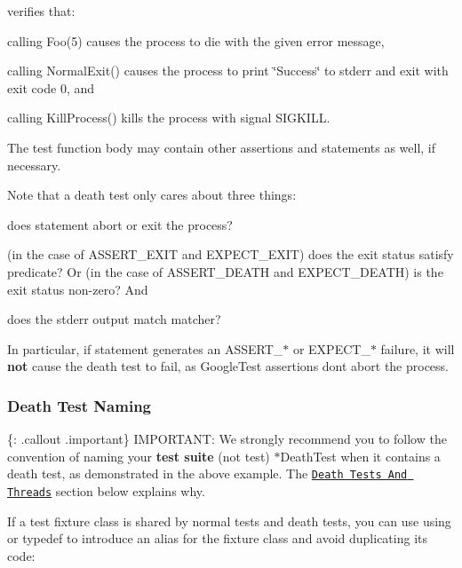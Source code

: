 verifies that\+:


\begin{DoxyItemize}
\item calling {\ttfamily Foo(5)} causes the process to die with the given error message,
\item calling {\ttfamily Normal\+Exit()} causes the process to print {\ttfamily \char`\"{}\+Success\char`\"{}} to stderr and exit with exit code 0, and
\item calling {\ttfamily Kill\+Process()} kills the process with signal {\ttfamily S\+I\+G\+K\+I\+LL}.
\end{DoxyItemize}

The test function body may contain other assertions and statements as well, if necessary.

Note that a death test only cares about three things\+:


\begin{DoxyEnumerate}
\item does {\ttfamily statement} abort or exit the process?
\item (in the case of {\ttfamily A\+S\+S\+E\+R\+T\+\_\+\+E\+X\+IT} and {\ttfamily E\+X\+P\+E\+C\+T\+\_\+\+E\+X\+IT}) does the exit status satisfy {\ttfamily predicate}? Or (in the case of {\ttfamily A\+S\+S\+E\+R\+T\+\_\+\+D\+E\+A\+TH} and {\ttfamily E\+X\+P\+E\+C\+T\+\_\+\+D\+E\+A\+TH}) is the exit status non-\/zero? And
\item does the stderr output match {\ttfamily matcher}?
\end{DoxyEnumerate}

In particular, if {\ttfamily statement} generates an {\ttfamily A\+S\+S\+E\+R\+T\+\_\+$\ast$} or {\ttfamily E\+X\+P\+E\+C\+T\+\_\+$\ast$} failure, it will {\bfseries not} cause the death test to fail, as Google\+Test assertions don\textquotesingle{}t abort the process.

\subsubsection*{Death Test Naming}

\{\+: .callout .important\} I\+M\+P\+O\+R\+T\+A\+NT\+: We strongly recommend you to follow the convention of naming your {\bfseries test suite} (not test) {\ttfamily $\ast$\+Death\+Test} when it contains a death test, as demonstrated in the above example. The \href{#death-tests-and-threads}{\tt Death Tests And Threads} section below explains why.

If a test fixture class is shared by normal tests and death tests, you can use {\ttfamily using} or {\ttfamily typedef} to introduce an alias for the fixture class and avoid duplicating its code\+:


